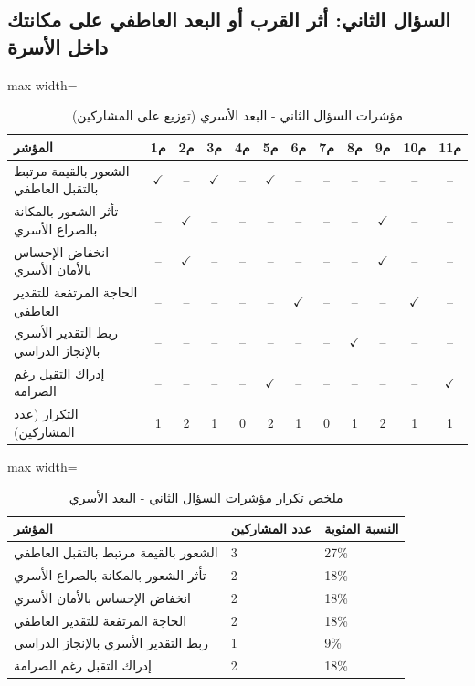 \documentclass[12pt,oneside]{report}
\begin{document}
\subsection{السؤال الثاني: أثر القرب أو البعد العاطفي على مكانتك داخل الأسرة}
\begin{table}[H]
\centering
\caption{مؤشرات السؤال الثاني - البعد الأسري (توزيع على المشاركين)}
\scriptsize
\renewcommand{\arraystretch}{1.3}
\setlength{\tabcolsep}{4pt}
\begin{adjustbox}{max width=\textwidth}
\begin{tabular}{l c c c c c c c c c c c}
\toprule
\textbf{المؤشر} & \textbf{م1} & \textbf{م2} & \textbf{م3} & \textbf{م4} & \textbf{م5} & \textbf{م6} & \textbf{م7} & \textbf{م8} & \textbf{م9} & \textbf{م10} & \textbf{م11} \\
\midrule
الشعور بالقيمة مرتبط بالتقبل العاطفي & $\checkmark$ & -- & $\checkmark$ & -- & $\checkmark$ & -- & -- & -- & -- & -- & -- \\
تأثر الشعور بالمكانة بالصراع الأسري & -- & $\checkmark$ & -- & -- & -- & -- & -- & -- & $\checkmark$ & -- & -- \\
انخفاض الإحساس بالأمان الأسري & -- & $\checkmark$ & -- & -- & -- & -- & -- & -- & $\checkmark$ & -- & -- \\
الحاجة المرتفعة للتقدير العاطفي & -- & -- & -- & -- & -- & $\checkmark$ & -- & -- & -- & $\checkmark$ & -- \\
ربط التقدير الأسري بالإنجاز الدراسي & -- & -- & -- & -- & -- & -- & -- & $\checkmark$ & -- & -- & -- \\
إدراك التقبل رغم الصرامة & -- & -- & -- & -- & $\checkmark$ & -- & -- & -- & -- & -- & $\checkmark$ \\
التكرار (عدد المشاركين) & 1 & 2 & 1 & 0 & 2 & 1 & 0 & 1 & 2 & 1 & 1 \\
\bottomrule
\end{tabular}
\end{adjustbox}
\end{table}
\begin{table}[H]
\centering
\caption{ملخص تكرار مؤشرات السؤال الثاني - البعد الأسري}
\small
\renewcommand{\arraystretch}{1.3}
\setlength{\tabcolsep}{4pt}
\begin{adjustbox}{max width=\textwidth}
\begin{tabular}{p{6cm} p{4cm} p{4cm}}
\toprule
\textbf{المؤشر} & \textbf{عدد المشاركين} & \textbf{النسبة المئوية} \\
\midrule
الشعور بالقيمة مرتبط بالتقبل العاطفي & 3 & 27\% \\
تأثر الشعور بالمكانة بالصراع الأسري & 2 & 18\% \\
انخفاض الإحساس بالأمان الأسري & 2 & 18\% \\
الحاجة المرتفعة للتقدير العاطفي & 2 & 18\% \\
ربط التقدير الأسري بالإنجاز الدراسي & 1 & 9\% \\
إدراك التقبل رغم الصرامة & 2 & 18\% \\
\bottomrule
\end{tabular}
\end{adjustbox}
\end{table}
\end{document}

